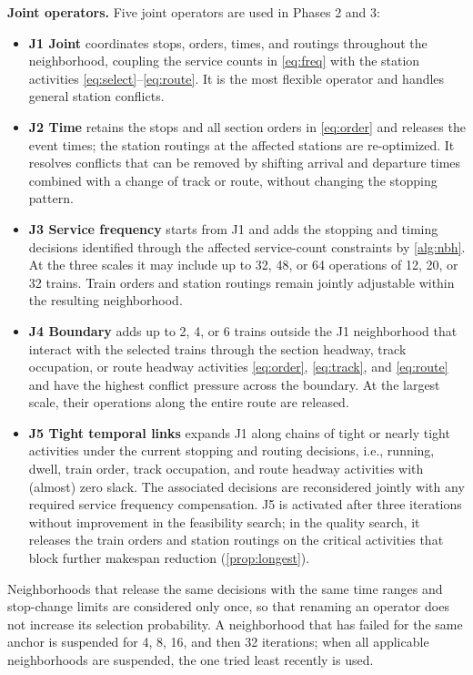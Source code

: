 \textbf{Joint operators.} Five joint operators are used in Phases 2 and 3:
\begin{itemize}
\item \textbf{J1 Joint} coordinates stops, orders, times, and routings throughout the neighborhood, coupling the service counts in \eqref{eq:freq} with the station activities \eqref{eq:select}--\eqref{eq:route}. It is the most flexible operator and handles general station conflicts.
\item \textbf{J2 Time} retains the stops and all section orders in \eqref{eq:order} and releases the event times; the station routings at the affected stations are re-optimized. It resolves conflicts that can be removed by shifting arrival and departure times combined with a change of track or route, without changing the stopping pattern.
\item \textbf{J3 Service frequency} starts from J1 and adds the stopping and timing decisions identified through the affected service-count constraints by \cref{alg:nbh}. At the three scales it may include up to 32, 48, or 64 operations of 12, 20, or 32 trains. Train orders and station routings remain jointly adjustable within the resulting neighborhood.
\item \textbf{J4 Boundary} adds up to 2, 4, or 6 trains outside the J1 neighborhood that interact with the selected trains through the section headway, track occupation, or route headway activities \eqref{eq:order}, \eqref{eq:track}, and \eqref{eq:route} and have the highest conflict pressure across the boundary. At the largest scale, their operations along the entire route are released.
\item \textbf{J5 Tight temporal links} expands J1 along chains of tight or nearly tight activities under the current stopping and routing decisions, i.e., running, dwell, train order, track occupation, and route headway activities with (almost) zero slack. The associated decisions are reconsidered jointly with any required service frequency compensation. J5 is activated after three iterations without improvement in the feasibility search; in the quality search, it releases the train orders and station routings on the critical activities that block further makespan reduction (\cref{prop:longest}).
\end{itemize}
Neighborhoods that release the same decisions with the same time ranges and stop-change limits are considered only once, so that renaming an operator does not increase its selection probability. A neighborhood that has failed for the same anchor is suspended for 4, 8, 16, and then 32 iterations; when all applicable neighborhoods are suspended, the one tried least recently is used.

